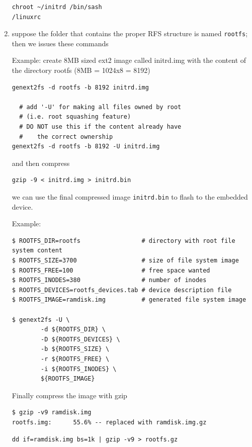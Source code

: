\begin{enumerate}
\begin{verbatim}
chroot ~/initrd /bin/sash
/linuxrc
\end{verbatim}

  
  \item suppose the folder that contains the proper RFS structure is named
  \verb!rootfs!; then we issues these commands

Example: create 8MB sized ext2 image called initrd.img with the content of the
directory rootfs (8MB = 1024x8 = 8192)
\begin{verbatim}
genext2fs -d rootfs -b 8192 initrd.img

  # add '-U' for making all files owned by root 
  # (i.e. root squashing feature)
  # DO NOT use this if the content already have
  #    the correct ownership
genext2fs -d rootfs -b 8192 -U initrd.img
\end{verbatim}
and then compress
\begin{verbatim}
gzip -9 < initrd.img > initrd.bin
\end{verbatim}
we can use the final compressed image \verb!initrd.bin! to flash to the embedded
device.
  
Example: 
\begin{verbatim}
$ ROOTFS_DIR=rootfs                 # directory with root file system content
$ ROOTFS_SIZE=3700                  # size of file system image
$ ROOTFS_FREE=100                   # free space wanted
$ ROOTFS_INODES=380                 # number of inodes
$ ROOTFS_DEVICES=rootfs_devices.tab # device description file
$ ROOTFS_IMAGE=ramdisk.img          # generated file system image

$ genext2fs -U \
        -d ${ROOTFS_DIR} \
        -D ${ROOTFS_DEVICES} \
        -b ${ROOTFS_SIZE} \
        -r ${ROOTFS_FREE} \
        -i ${ROOTFS_INODES} \
        ${ROOTFS_IMAGE}
\end{verbatim}


Finally compress the image with gzip
\begin{verbatim}
$ gzip -v9 ramdisk.img
rootfs.img:      55.6% -- replaced with ramdisk.img.gz
\end{verbatim}
\begin{verbatim}
dd if=ramdisk.img bs=1k | gzip -v9 > rootfs.gz
\end{verbatim}


\end{enumerate}

